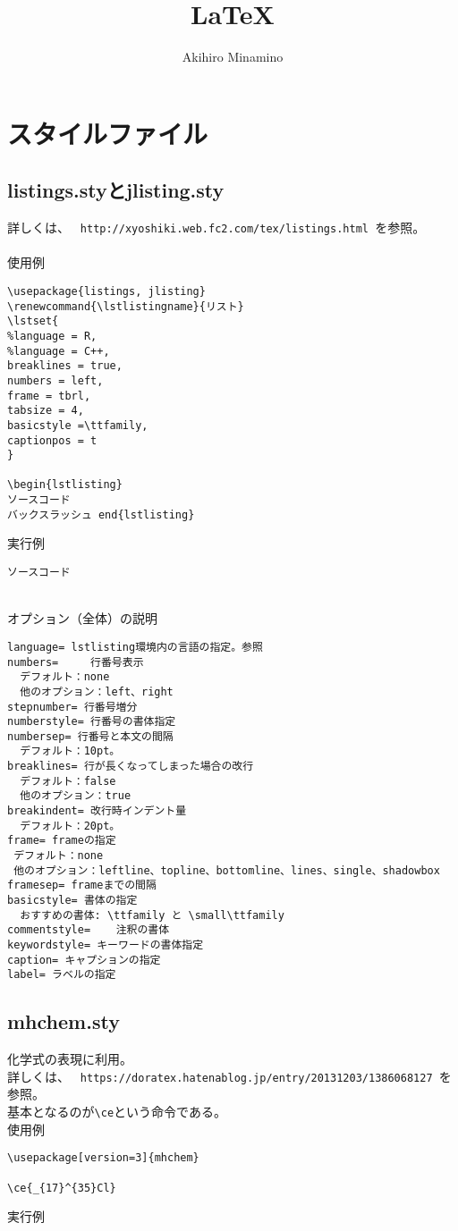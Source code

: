 \documentclass[11pt, oneside]{article}   	%
\title{\LaTeX}
\author{Akihiro Minamino}
\renewcommand{\lstlistingname}{リスト}
\begin{document}
\maketitle

\section{スタイルファイル}
\subsection{listings.styとjlisting.sty}
詳しくは、
\verb| http://xyoshiki.web.fc2.com/tex/listings.html |を参照。\\
　\\
使用例
\begin{lstlisting}
\usepackage{listings, jlisting}
\renewcommand{\lstlistingname}{リスト}
\lstset{
%language = R,
%language = C++,   
breaklines = true,
numbers = left,
frame = tbrl,
tabsize = 4,
basicstyle =\ttfamily,
captionpos = t
}

\begin{lstlisting}
ソースコード
バックスラッシュ end{lstlisting}
\end{lstlisting} 
実行例
\begin{lstlisting}
ソースコード
\end{lstlisting}
　\\
オプション（全体）の説明
\begin{lstlisting}
language= lstlisting環境内の言語の指定。参照
numbers=	 行番号表示
  デフォルト：none
  他のオプション：left、right
stepnumber= 行番号増分
numberstyle= 行番号の書体指定
numbersep= 行番号と本文の間隔
  デフォルト：10pt。
breaklines= 行が長くなってしまった場合の改行
  デフォルト：false
  他のオプション：true
breakindent= 改行時インデント量
  デフォルト：20pt。
frame= frameの指定
 デフォルト：none
 他のオプション：leftline、topline、bottomline、lines、single、shadowbox
framesep= frameまでの間隔
basicstyle= 書体の指定
  おすすめの書体: \ttfamily と \small\ttfamily
commentstyle=	 注釈の書体
keywordstyle= キーワードの書体指定
caption= キャプションの指定
label= ラベルの指定
\end{lstlisting}


\subsection{mhchem.sty}
化学式の表現に利用。\\
詳しくは、
\verb| https://doratex.hatenablog.jp/entry/20131203/1386068127 |を参照。\\
基本となるのが\verb|\ce|という命令である。
　\\
使用例
\begin{lstlisting}
\usepackage[version=3]{mhchem}

\ce{_{17}^{35}Cl}
\end{lstlisting} 
実行例\\
\end{document}
